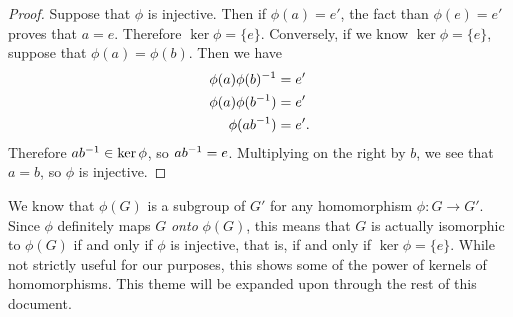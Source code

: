 \begin{proof}
Suppose that $\phi$ is injective. Then if $\phi(a) = e'$, the fact than $\phi(e) = e'$ proves that $a = e$. Therefore $\ker\phi = \{e\}$. Conversely, if we know $\ker\phi = \{e\}$, suppose that $\phi(a) = \phi(b)$. Then we have
\begin{align*}
    \phi(a)\phi(b)^{-1} &= e' \\
    \phi(a)\phi(b^{-1}) &= e' \\
    \phi(a b^{-1}) &= e'.
\end{align*}
Therefore $ab^{-1} \in \ker\phi$, so $ab^{-1} = e$. Multiplying on the right by $b$, we see that $a = b$, so $\phi$ is injective.

\end{proof}

We \extra know that $\phi(G)$ is a subgroup of $G'$ for any homomorphism $\phi: G \to G'$. Since $\phi$ definitely maps $G$ \textit{onto} $\phi(G)$, this means that $G$ is actually isomorphic to $\phi(G)$ if and only if $\phi$ is injective, that is, if and only if $\ker\phi = \{e\}$. While not strictly useful for our purposes, this shows some of the power of kernels of homomorphisms. This theme will be expanded upon through the rest of this document.